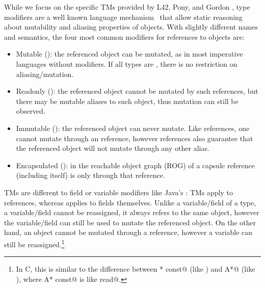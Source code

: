 While we focus on the specific TMs provided by L42, Pony, and Gordon \etal, type modifiers
 are a well known language mechanism~\cite{TschantzErnst05,BirkaErnst04,OstlundEtAl08,clebsch2015deny,GianniniEtAl16,GordonEtAl12}
 that allow static reasoning about mutability and aliasing properties of objects.
With slightly different names and semantics, the four most common modifiers for references to objects are:
\begin{itemize}
\item Mutable (\Q@mut@): the referenced object can be mutated, as in most imperative languages without modifiers.
If all types are \Q@mut@, there is no restriction on aliasing/mutation.
\item Readonly (\Q@read@): the referenced object cannot be mutated by such references, but there may be mutable aliases to such object, thus mutation can still be observed. 
\item Immutable (\Q@imm@): the referenced object can never mutate. Like \Q@read@ references, one cannot mutate through an \Q@imm@ reference, however \Q@imm@ references also guarantee that the referenced object will not mutate through any other alias.
\item Encapsulated (\Q@capsule@):
   in the reachable object graph (ROG) of a capsule reference (including itself) is  only  through that reference. 
\end{itemize}

\noindent TMs are different to field or variable modifiers like Java's \Q@final@: TMs apply to references, whereas \Q@final@ applies to fields themselves. Unlike a variable/field of a \Q@read@ type, a \Q@final@ variable/field cannot be reassigned, it always refers to the same object, however the variable/field can still be used to mutate the referenced object.
On the other hand, an object cannot be mutated through a \Q@read@ reference, however a \Q@read@ variable can still be reassigned.\footnote{In C, this is similar to the difference between \Q@A* const@ (like \Q@final@) and \Q@const A*@ (like \Q@read@), where \Q@const A* const@ is like \Q@final read@.}


